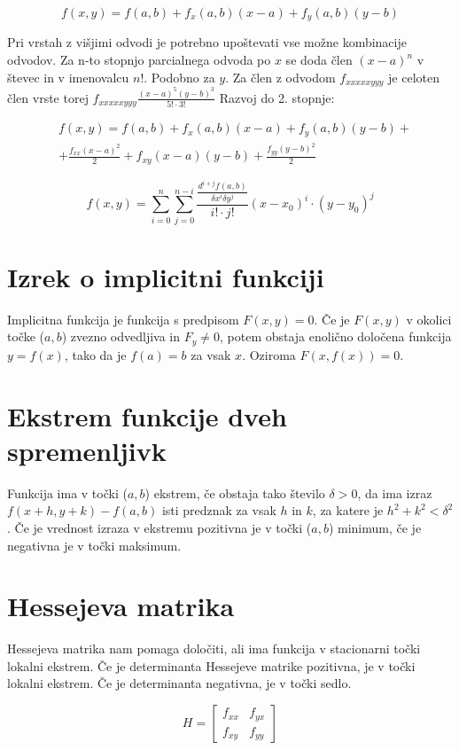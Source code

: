 \documentclass[12pt]{report}
\begin{document}
\[
f(x,y) = f(a,b) +f_x(a,b)(x-a)+f_y(a,b)(y-b)
\]

Pri vrstah z višjimi odvodi je potrebno upoštevati vse možne kombinacije odvodov. Za n-to stopnjo parcialnega odvoda po $x$ se doda člen $(x-a)^n$ v števec in v imenovalcu $n!$. Podobno za $y$. Za člen z odvodom $f_{xxxxxyyy}$ je celoten člen vrste torej $f_{xxxxxyyy} \frac{(x-a)^5(y-b)^3}{5! \cdot 3!}$ Razvoj do 2. stopnje:


\begin{align*} 
&f(x,y) = f(a,b) +f_x(a,b)(x-a)+f_y(a,b)(y-b)+ \\ 
&+\frac{f_{xx}(x-a)^2}{2}+f_{xy}(x-a)(y-b)+\frac{f_{yy}(y-b)^2}{2} 
\end{align*}

\[f(x,y) = \sum\limits_{i=0}^n\sum\limits_{j=0}^{n-i}\frac{\frac{d^{i+j}f(a,b)}{\delta x^i\delta y^j}}{i!\cdot j!}(x-x_0)^i\cdot(y-y_0)^j\]


\section*{Izrek o implicitni funkciji}
Implicitna funkcija je funkcija s predpisom $F(x, y) = 0$.
Če je $F(x,y)$ v okolici točke ($a,b$) zvezno odvedljiva in $F_y \neq 0$, potem obstaja enolično določena funkcija $y = f(x)$, tako da je $f(a) = b$ za vsak $x$. Oziroma $F(x,f(x)) = 0$.


\section*{Ekstrem funkcije dveh spremenljivk}
Funkcija ima v točki ($a, b$) ekstrem, če obstaja tako število $\delta>0$, da ima izraz $f(x+h,y+k)-f(a,b)$ isti predznak za vsak $h$ in $k$, za katere je $h^2+k^2 < \delta^2$. Če je vrednost izraza v ekstremu pozitivna je v točki ($a, b$) minimum, če je negativna je v točki maksimum.


\section*{Hessejeva matrika}
Hessejeva matrika nam pomaga določiti, ali ima funkcija v stacionarni točki lokalni ekstrem. Če je determinanta Hessejeve matrike pozitivna, je v točki lokalni ekstrem. Če je determinanta negativna, je v točki sedlo.

\[H = 
\begin{bmatrix}
 f_{xx} & f_{yx}\\
 f_{xy} & f_{yy}
\end{bmatrix} 
\]
\end{document}
